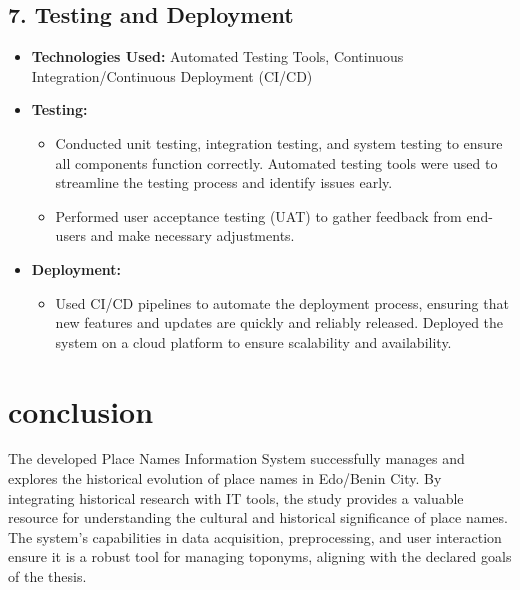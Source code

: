 \subsection{7. Testing and Deployment}
\begin{itemize}
    \item \textbf{Technologies Used:} Automated Testing Tools, Continuous Integration/Continuous Deployment (CI/CD)
    \item \textbf{Testing:}
        \begin{itemize}
            \item Conducted unit testing, integration testing, and system testing to ensure all components function correctly. Automated testing tools were used to streamline the testing process and identify issues early.
            \item Performed user acceptance testing (UAT) to gather feedback from end-users and make necessary adjustments.
        \end{itemize}
    \item \textbf{Deployment:}
        \begin{itemize}
            \item Used CI/CD pipelines to automate the deployment process, ensuring that new features and updates are quickly and reliably released. Deployed the system on a cloud platform to ensure scalability and availability.
        \end{itemize}
\end{itemize}




\section{conclusion}
The developed Place Names Information System successfully manages and explores the historical evolution of place names in Edo/Benin City. By integrating historical research with IT tools, the study provides a valuable resource for understanding the cultural and historical significance of place names. The system's capabilities in data acquisition, preprocessing, and user interaction ensure it is a robust tool for managing toponyms, aligning with the declared goals of the thesis.
